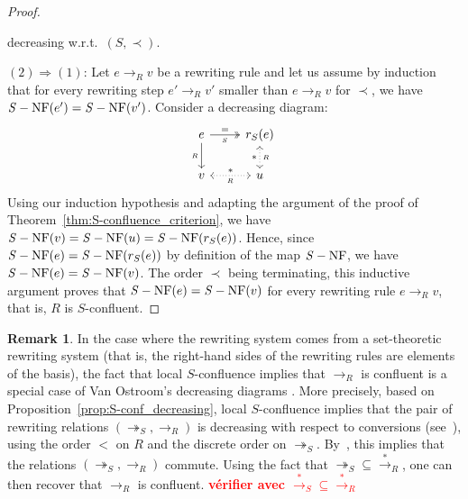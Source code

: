 \documentclass[11pt]{article}
\theoremstyle{definition}
\newtheorem{remark}[theorem]{Remark}
\newcommand\todo[1]{{\bf\textcolor{red}{#1}}}
\newcommand\rewR{\to_R}
\newcommand\parS{\twoheadrightarrow_S}
\newcommand\transR{\overset{*}{\to}_R}
\newcommand\transS{\overset{*}{\to}_S}
\DeclareMathOperator{\SNF}{{\it S}-NF}
\begin{document}
\begin{proof}
\begin{itemize}
    decreasing w.r.t.\ $(S,\prec)$.
  \end{itemize}
  $(2)\Rightarrow (1)$: Let $e\rewR v$ be a rewriting rule and let us
  assume by induction that for every rewriting step $e'\rewR v'$ smaller
  than $e\rewR v$ for $\prec$, we have $\SNF(e')=\SNF(v')$. Consider a
  decreasing diagram:
  \[\begin{tikzcd}
  e\ar[d, "_R"']\ar[r, twoheadrightarrow, "=", "_S"'] &
  r_S(e)\ar[d, leftrightarrow, dotted, "*"', "_R"]\\
  v\ar[r, leftrightarrow, dotted, "*", "_R"'] & u
  \end{tikzcd}\]
  Using our induction hypothesis and adapting the argument of the proof
  of Theorem~\ref{thm:S-confluence_criterion}, we have 
  $\SNF(v)=\SNF(u)=\SNF(r_S(e))$. Hence, since $\SNF(e)=\SNF(r_S(e))$ by
  definition of the map $\SNF$, we have $\SNF(e)=\SNF(v)$. The order
  $\prec$ being terminating, this inductive argument proves that
  $\SNF(e)=\SNF(v)$ for every rewriting rule $e\rewR v$, that is, $R$ is
  $S$-confluent.
\end{proof}
\smallskip

\begin{remark}
  In the case where the rewriting system comes from a set-theoretic rewriting
  system (that is, the right-hand sides of the rewriting rules are elements of
  the basis), the fact that local $S$-confluence implies that $\rewR$ is
  confluent is a special case of Van Ostroom's decreasing diagrams
  \cite{van2008confluence}. More precisely, based on
  Proposition~\ref{prop:S-conf_decreasing}, local $S$-confluence implies
  that the pair of rewriting relations $(\parS,\rewR)$ is decreasing with
  respect to conversions (see~\cite[Definition 3]{van2008confluence}),
  using the order $<$ on $R$ and the discrete order on $\parS$.
  By~\cite[Theorem 3]{van2008confluence}, this implies that the relations
  $(\parS,\rewR)$ commute. Using the fact that $\parS \subseteq \transR$,
  one can then recover that $\rewR$ is confluent. \todo{vérifier avec
  $\transS\subseteq\transR$}
\end{remark}
\smallskip
\end{document}
